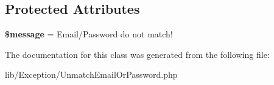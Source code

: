 \subsection*{Protected Attributes}
\begin{DoxyCompactItemize}
\item 
{\bfseries \$message} = \textquotesingle{}Email/Password do not match!\textquotesingle{}\hypertarget{class_my_app_1_1_exception_1_1_unmatch_email_or_password_a034c1f2523c80dd4050626189d5c3340}{}\label{class_my_app_1_1_exception_1_1_unmatch_email_or_password_a034c1f2523c80dd4050626189d5c3340}

\end{DoxyCompactItemize}


The documentation for this class was generated from the following file\+:\begin{DoxyCompactItemize}
\item 
lib/\+Exception/Unmatch\+Email\+Or\+Password.\+php\end{DoxyCompactItemize}
